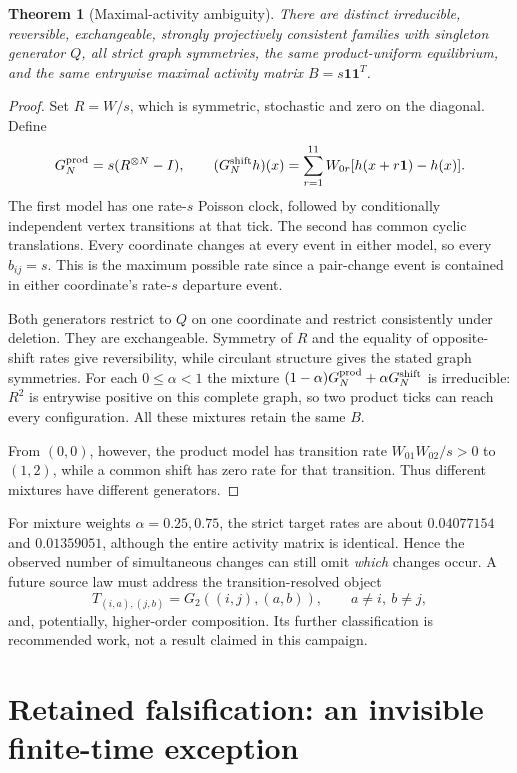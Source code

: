 \documentclass[11pt,a4paper]{article}
\newtheorem{theorem}{Theorem}
\newcommand{\one}{\mathbf1}
\begin{document}
\begin{theorem}[Maximal-activity ambiguity]
There are distinct irreducible, reversible, exchangeable, strongly
projectively consistent families with singleton generator $Q$, all strict
graph symmetries, the same product-uniform equilibrium, and the same
entrywise maximal activity matrix $B=s\one\one^T$.
\end{theorem}
\begin{proof}
Set $R=W/s$, which is symmetric, stochastic and zero on the diagonal.
Define
\[
 G_N^{\rm prod}=s(R^{\otimes N}-I),\qquad
 (G_N^{\rm shift}h)(x)=\sum_{r=1}^{11}W_{0r}
                     [h(x+r\one)-h(x)].
\]
The first model has one rate-$s$ Poisson clock, followed by conditionally
independent vertex transitions at that tick. The second has common cyclic
translations. Every coordinate changes at every event in either model,
so every $b_{ij}=s$. This is the maximum possible rate since a pair-change
event is contained in either coordinate's rate-$s$ departure event.

Both generators restrict to $Q$ on one coordinate and restrict consistently
under deletion. They are exchangeable. Symmetry of $R$ and the equality of
opposite-shift rates give reversibility, while circulant structure gives
the stated graph symmetries. For each $0\le\alpha<1$ the mixture
$(1-\alpha)G_N^{\rm prod}+\alpha G_N^{\rm shift}$ is irreducible:
$R^2$ is entrywise positive on this complete graph, so two product ticks
can reach every configuration. All these mixtures retain the same $B$.

From $(0,0)$, however, the product model has transition rate
$W_{01}W_{02}/s>0$ to $(1,2)$, while a common shift has zero rate for that
transition. Thus different mixtures have different generators.
\end{proof}

For mixture weights $\alpha=0.25,0.75$, the strict target rates are about
$0.04077154$ and $0.01359051$, although the entire activity matrix is
identical. Hence the observed number of simultaneous changes can still
omit \emph{which} changes occur. A future source law must address the
transition-resolved object
\[
 T_{(i,a),(j,b)}=G_2((i,j),(a,b)),\qquad a\ne i,\ b\ne j,
\]
and, potentially, higher-order composition. Its further classification is
recommended work, not a result claimed in this campaign.

\section{Retained falsification: an invisible finite-time exception}
\end{document}
